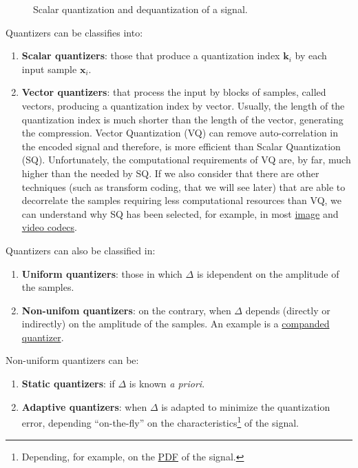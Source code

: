 \begin{figure}
  \centering
  \caption{Scalar quantization and dequantization of a signal.}
  \label{fig:Q}
\end{figure}

Quantizers can be classifies into:
\begin{enumerate}
\item \textbf{Scalar quantizers}: those that produce a quantization
  index ${\mathbf k}_i$ by each input sample ${\mathbf x}_i$.
\item \textbf{Vector quantizers}: that process the input by blocks of
  samples, called vectors, producing a quantization index by vector.
  Usually, the length of the quantization index is much shorter than
  the length of the vector, generating the compression. Vector
  Quantization (VQ) can remove auto-correlation in the encoded signal
  and therefore, is more efficient than Scalar Quantization
  (SQ). Unfortunately, the computational requirements of VQ are, by
  far, much higher than the needed by SQ. If we also consider that
  there are other techniques (such as transform coding, that we will
  see later) that are able to decorrelate the samples requiring less
  computational resources than VQ, we can understand why SQ has been
  selected, for example, in
  most \href{https://en.wikipedia.org/wiki/Image_compression}{image}
  and \href{https://en.wikipedia.org/wiki/Video_coding_format}{video
  codecs}.
\end{enumerate}

Quantizers can also be classified in:
\begin{enumerate}
\item \textbf{Uniform quantizers}: those in which $\Delta$ is
  idependent on the amplitude of the samples.
\item \textbf{Non-unifom quantizers}: on the contrary, when $\Delta$
  depends (directly or indirectly) on the amplitude of the samples. An
  example is a
  \href{https://en.wikipedia.org/wiki/Companding}{companded
    quantizer}.
\end{enumerate}

Non-uniform quantizers can be:
\begin{enumerate}
\item \textbf{Static quantizers}: if $\Delta$ is known \emph{a
priori}.
\item \textbf{Adaptive quantizers}: when $\Delta$ is adapted to
  minimize the quantization error, depending ``on-the-fly'' on the
  characteristics\footnote{Depending, for example, on the
    \href{https://en.wikipedia.org/wiki/Probability_density_function}{PDF}
    of the signal.} of the signal.
\end{enumerate}

